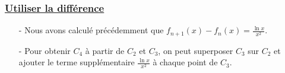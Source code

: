 \documentclass[12pt]{article}
\begin{document}
\begin{enumerate}
\subsubsection*{\underline{ Utiliser la différence }}
\begin{itemize}
    \item[-] Nous avons calculé précédemment que \( f_{n+1}(x) - f_n(x) = \frac{\ln x}{x^2} \).
    \item[-] Pour obtenir \( C_4 \) à partir de \( C_2 \) et \( C_3 \), on peut superposer \( C_3 \) sur \( C_2 \) et ajouter le terme supplémentaire \(\frac{\ln x}{x^2}\) à chaque point de \( C_3 \).
\end{itemize}

\end{enumerate}
\end{document}
